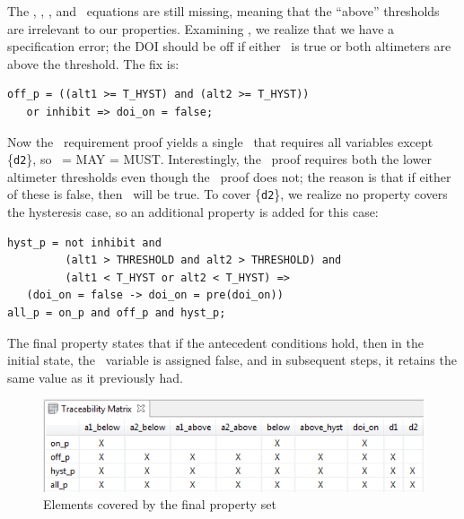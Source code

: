 The \abovehyst, \aoneabove, \atwoabove, and \dtwo\ equations are still missing, meaning that the ``above'' thresholds are irrelevant to our properties.  Examining \offp, we realize that we have a specification error; the DOI should be off if either \inhibit\ is true or both altimeters are above the threshold. The fix is:

{\smaller
\begin{verbatim}
off_p = ((alt1 >= T_HYST) and (alt2 >= T_HYST))
   or inhibit => doi_on = false;
\end{verbatim}
}

\noindent Now the \allp\ requirement proof yields a single \mivc ~that requires all variables except \{\texttt{d2}\}, so \mivc ~= MAY = MUST.  Interestingly, the \offp\ proof requires both the lower altimeter thresholds even though the \onp\ proof does not; the reason is that if either of these is false, then \doion\ will be true.  To cover \{\texttt{d2}\}, we realize no property covers the hysteresis case, so an additional property is added for this case:

{\smaller
\begin{verbatim}
hyst_p = not inhibit and
         (alt1 > THRESHOLD and alt2 > THRESHOLD) and
         (alt1 < T_HYST or alt2 < T_HYST) =>
   (doi_on = false -> doi_on = pre(doi_on))
all_p = on_p and off_p and hyst_p;
\end{verbatim}
}
\noindent The final property states that if the antecedent conditions hold, then in the initial state, the \doion\ variable is assigned false, and in subsequent steps, it retains the same value as it previously had.

\begin{figure}
  \centering
  \includegraphics[width=\columnwidth]{figs/spear_set4.png}
  \vspace{-0.2in}
  \caption{Elements covered by the final property set}
  \label{fig:propertyset4}
\end{figure}

